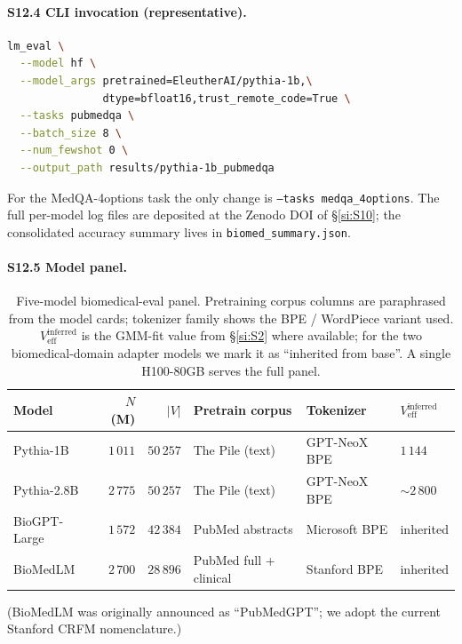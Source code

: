 \documentclass[11pt,a4paper]{article}
\begin{document}
\paragraph{S12.4 CLI invocation (representative).}
\begin{lstlisting}[language=bash]
lm_eval \
  --model hf \
  --model_args pretrained=EleutherAI/pythia-1b,\
               dtype=bfloat16,trust_remote_code=True \
  --tasks pubmedqa \
  --batch_size 8 \
  --num_fewshot 0 \
  --output_path results/pythia-1b_pubmedqa
\end{lstlisting}
For the MedQA-4options task the only change is
\texttt{--tasks medqa\_4options}. The full per-model log files are
deposited at the Zenodo DOI of \S\ref{si:S10}; the consolidated
accuracy summary lives in \texttt{biomed\_summary.json}.

\paragraph{S12.5 Model panel.}
\begin{table}[h]
\centering
\small
\caption{Five-model biomedical-eval panel. Pretraining corpus
columns are paraphrased from the model cards; tokenizer family
shows the BPE / WordPiece variant used.
$V_\mathrm{eff}^\mathrm{inferred}$ is the GMM-fit value from
\S\ref{si:S2} where available; for the two biomedical-domain
adapter models we mark it as ``inherited from base''.
A single H100-80GB serves the full panel.}
\label{tab:S12-panel}
\begin{tabular}{lrrlll}
\toprule
Model               & $N$ (M) & $|V|$    & Pretrain corpus      & Tokenizer        & $V_\mathrm{eff}^\mathrm{inferred}$ \\
\midrule
Pythia-1B           & $1\,011$ & $50\,257$ & The Pile (text)    & GPT-NeoX BPE     & $1\,144$ \\
Pythia-2.8B         & $2\,775$ & $50\,257$ & The Pile (text)    & GPT-NeoX BPE     & $\sim\!2\,800$ \\
BioGPT-Large        & $1\,572$ & $42\,384$ & PubMed abstracts   & Microsoft BPE    & inherited \\
BioMedLM            & $2\,700$ & $28\,896$ & PubMed full + clinical & Stanford BPE & inherited \\
\bottomrule
\end{tabular}
\end{table}

(BioMedLM was originally announced as ``PubMedGPT''; we adopt the
current Stanford CRFM nomenclature.)
\end{document}
